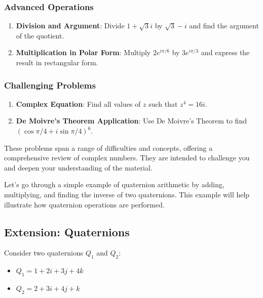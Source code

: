 \documentclass[
]{article}
\providecommand{\tightlist}{%
  \setlength{\itemsep}{0pt}\setlength{\parskip}{0pt}}
\def\tightlist{}
\begin{document}
\subsubsection{Advanced Operations}\label{advanced-operations}

\begin{enumerate}
\def\labelenumi{\arabic{enumi}.}
\setcounter{enumi}{16}
\tightlist
\item
  \textbf{Division and Argument}: Divide \(1 + \sqrt{3}i\) by
  \(\sqrt{3} - i\) and find the argument of the quotient.
\item
  \textbf{Multiplication in Polar Form}: Multiply \(2e^{i\pi/6}\) by
  \(3e^{i\pi/3}\) and express the result in rectangular form.
\end{enumerate}

\subsubsection{Challenging Problems}\label{challenging-problems}

\begin{enumerate}
\def\labelenumi{\arabic{enumi}.}
\setcounter{enumi}{18}
\tightlist
\item
  \textbf{Complex Equation}: Find all values of \(z\) such that
  \(z^4 = 16i\).
\item
  \textbf{De Moivre's Theorem Application}: Use De Moivre's Theorem to
  find \((\cos \pi/4 + i\sin \pi/4)^6\).
\end{enumerate}

These problems span a range of difficulties and concepts, offering a
comprehensive review of complex numbers. They are intended to challenge
you and deepen your understanding of the material.

Let's go through a simple example of quaternion arithmetic by adding,
multiplying, and finding the inverse of two quaternions. This example
will help illustrate how quaternion operations are performed.

\subsection{Extension: Quaternions}\label{extension-quaternions}

Consider two quaternions \(Q_1\) and \(Q_2\):

\begin{itemize}
\tightlist
\item
  \(Q_1 = 1 + 2i + 3j + 4k\)
\item
  \(Q_2 = 2 + 3i + 4j + k\)
\end{itemize}
\end{document}
